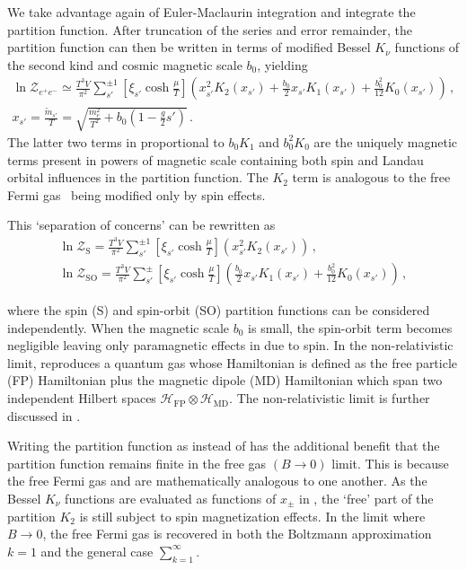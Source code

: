 We take advantage again of Euler-Maclaurin integration  and integrate the partition function. After truncation of the series and error remainder, the partition function  can then be written in terms of modified Bessel $K_{\nu}$ functions of the second kind and cosmic magnetic scale $b_{0}$, yielding
\begin{gather}
    \label{boltzmann}
    \boxed{\ln\mathcal{Z}_{e^{+}e^{-}}\simeq\frac{T^{3}V}{\pi^{2}}\sum_{s'}^{\pm1}\left[\xi_{s'}\cosh{\frac{\mu}{T}}\right]
    \left(x_{s'}^{2}K_{2}(x_{s'})+\frac{b_{0}}{2}x_{s'}K_{1}(x_{s'})+\frac{b_{0}^{2}}{12}K_{0}(x_{s'})\right)}\,,\\
    \label{xfunc}
    x_{s'}=\frac{{\tilde m}_{s'}}{T}=\sqrt{\frac{m_{e}^{2}}{T^{2}}+b_{0}\left(1-\frac{g}{2}s'\right)}\,.
\end{gather}
The latter two terms in  proportional to $b_{0}K_{1}$ and $b_{0}^{2}K_{0}$ are the uniquely magnetic terms present in powers of magnetic scale  containing both spin and Landau orbital influences in the partition function. The $K_{2}$ term is analogous to the free Fermi gas~\citep{greiner2012thermodynamics} being modified only by spin effects.

This `separation of concerns' can be rewritten as
\begin{gather}
    \label{spin}
    \ln\mathcal{Z}_\mathrm{S}=\frac{T^{3}V}{\pi^{2}}\sum_{s'}^{\pm1}\left[\xi_{s'}\cosh{\frac{\mu}{T}}\right]\left(x_{s'}^{2}K_{2}(x_{s'})\right)\,,\\
    \label{spinorbit}
    \ln\mathcal{Z}_\mathrm{SO}=\frac{T^{3}V}{\pi^{2}}\sum_{s'}^{\pm}\left[\xi_{s'}\cosh{\frac{\mu}{T}}\right]
    \left(\frac{b_{0}}{2}x_{s'}K_{1}(x_{s'})+\frac{b_{0}^{2}}{12}K_{0}(x_{s'})\right)\,,        
\end{gather}

where the spin (S) and spin-orbit (SO) partition functions can be considered independently. When the magnetic scale $b_{0}$ is small, the spin-orbit term  becomes negligible leaving only paramagnetic effects in  due to spin. In the non-relativistic limit,  reproduces a quantum gas whose Hamiltonian is defined as the free particle (FP) Hamiltonian plus the magnetic dipole (MD) Hamiltonian which span two independent Hilbert spaces $\mathcal{H}_\mathrm{FP}\otimes\mathcal{H}_\mathrm{MD}$. The non-relativistic limit is further discussed in .

Writing the partition function as  instead of  has the additional benefit that the partition function remains finite in the free gas $({B}\rightarrow0)$ limit. This is because the free Fermi gas and  are mathematically analogous to one another. As the Bessel $K_{\nu}$ functions are evaluated as functions of $x_{\pm}$ in , the `free' part of the partition $K_{2}$ is still subject to spin magnetization effects. In the limit where ${B}\rightarrow0$, the free Fermi gas is recovered in both the Boltzmann approximation $k=1$ and the general case $\sum_{k=1}^{\infty}$.

